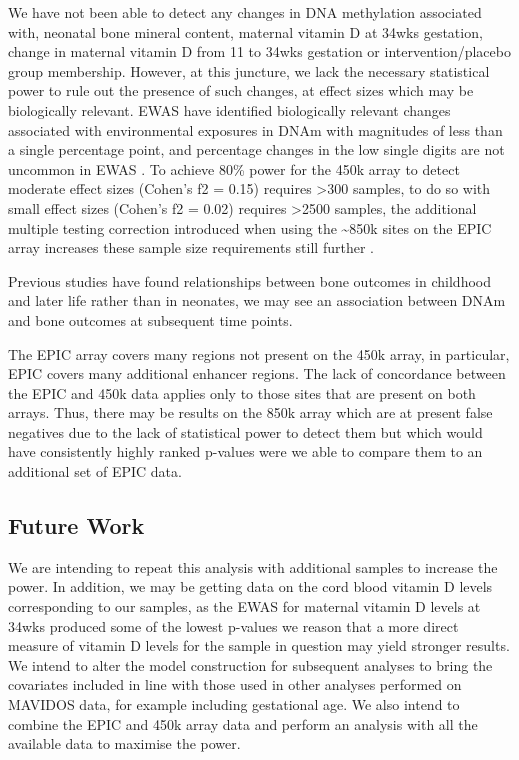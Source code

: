\documentclass[
]{book}
\begin{document}
We have not been able to detect any changes in DNA methylation associated with, neonatal bone mineral content, maternal vitamin D at 34wks gestation, change in maternal vitamin D from 11 to 34wks gestation or intervention/placebo group membership.
However, at this juncture, we lack the necessary statistical power to rule out the presence of such changes, at effect sizes which may be biologically relevant.
EWAS have identified biologically relevant changes associated with environmental exposures in DNAm with magnitudes of less than a single percentage point, and percentage changes in the low single digits are not uncommon in EWAS \citep{Breton2017}.
To achieve 80\% power for the 450k array to detect moderate effect sizes (Cohen's f2 = 0.15) requires \textgreater300 samples, to do so with small effect sizes (Cohen's f2 = 0.02) requires \textgreater2500 samples, the additional multiple testing correction introduced when using the \textasciitilde850k sites on the EPIC array increases these sample size requirements still further \citep{Cohen1988}.

Previous studies have found relationships between bone outcomes in childhood and later life rather than in neonates, we may see an association between DNAm and bone outcomes at subsequent time points.

The EPIC array covers many regions not present on the 450k array, in particular, EPIC covers many additional enhancer regions.
The lack of concordance between the EPIC and 450k data applies only to those sites that are present on both arrays.
Thus, there may be results on the 850k array which are at present false negatives due to the lack of statistical power to detect them but which would have consistently highly ranked p-values were we able to compare them to an additional set of EPIC data.

\hypertarget{future-work}{%
\subsection{Future Work}\label{future-work}}

We are intending to repeat this analysis with additional samples to increase the power.
In addition, we may be getting data on the cord blood vitamin D levels corresponding to our samples, as the EWAS for maternal vitamin D levels at 34wks produced some of the lowest p-values we reason that a more direct measure of vitamin D levels for the sample in question may yield stronger results.
We intend to alter the model construction for subsequent analyses to bring the covariates included in line with those used in other analyses performed on MAVIDOS data, for example including gestational age.
We also intend to combine the EPIC and 450k array data and perform an analysis with all the available data to maximise the power.
\end{document}
